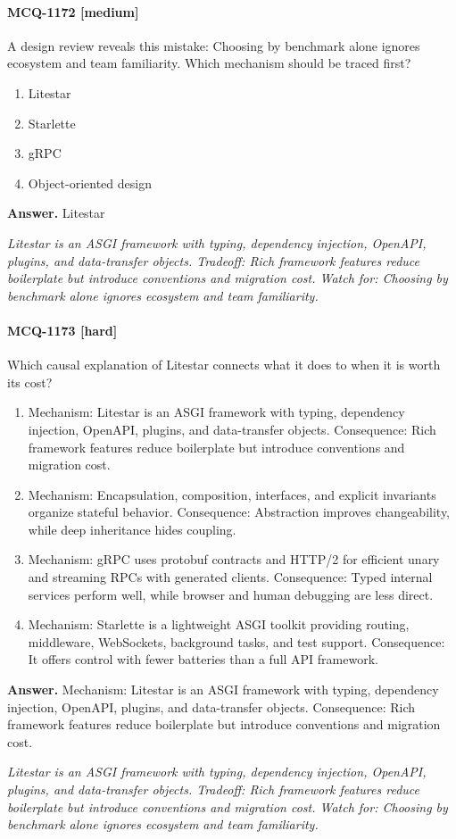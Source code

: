 \paragraph{MCQ-1172 [medium]} A design review reveals this mistake: Choosing by benchmark alone ignores ecosystem and team familiarity. Which mechanism should be traced first?
\begin{enumerate}[label=\Alph*.]
\item Litestar
\item Starlette
\item gRPC
\item Object-oriented design
\end{enumerate}
\noindent\textbf{Answer.} Litestar
\par\textit{Litestar is an ASGI framework with typing, dependency injection, OpenAPI, plugins, and data-transfer objects. Tradeoff: Rich framework features reduce boilerplate but introduce conventions and migration cost. Watch for: Choosing by benchmark alone ignores ecosystem and team familiarity.}
\paragraph{MCQ-1173 [hard]} Which causal explanation of Litestar connects what it does to when it is worth its cost?
\begin{enumerate}[label=\Alph*.]
\item Mechanism: Litestar is an ASGI framework with typing, dependency injection, OpenAPI, plugins, and data-transfer objects. Consequence: Rich framework features reduce boilerplate but introduce conventions and migration cost.
\item Mechanism: Encapsulation, composition, interfaces, and explicit invariants organize stateful behavior. Consequence: Abstraction improves changeability, while deep inheritance hides coupling.
\item Mechanism: gRPC uses protobuf contracts and HTTP/2 for efficient unary and streaming RPCs with generated clients. Consequence: Typed internal services perform well, while browser and human debugging are less direct.
\item Mechanism: Starlette is a lightweight ASGI toolkit providing routing, middleware, WebSockets, background tasks, and test support. Consequence: It offers control with fewer batteries than a full API framework.
\end{enumerate}
\noindent\textbf{Answer.} Mechanism: Litestar is an ASGI framework with typing, dependency injection, OpenAPI, plugins, and data-transfer objects. Consequence: Rich framework features reduce boilerplate but introduce conventions and migration cost.
\par\textit{Litestar is an ASGI framework with typing, dependency injection, OpenAPI, plugins, and data-transfer objects. Tradeoff: Rich framework features reduce boilerplate but introduce conventions and migration cost. Watch for: Choosing by benchmark alone ignores ecosystem and team familiarity.}
